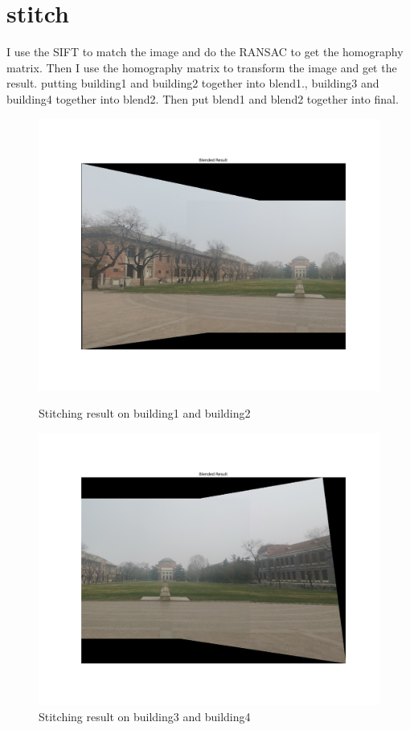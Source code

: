 \documentclass[]{article}
\begin{document}
\section{stitch}
I use the SIFT to match the image and do the RANSAC to get the homography matrix.
Then I use the homography matrix to transform the image and get the result. putting building1 and building2 together into blend1., building3 and building4 together into blend2. Then put blend1 and blend2 together into final.
\begin{figure}[h]
	\centering
	\begin{minipage}{0.48\textwidth}
		\centering
		\includegraphics[width=\textwidth]{blend1.png}
		\caption{Stitching result on building1 and building2}
		\label{fig:stitch1}
	\end{minipage}
	\hfill
	\begin{minipage}{0.48\textwidth}
		\centering
		\includegraphics[width=\textwidth]{blend2.png}
		\caption{Stitching result on building3 and building4}
		\label{fig:stitch2}
	\end{minipage}
\end{figure}
\end{document}
